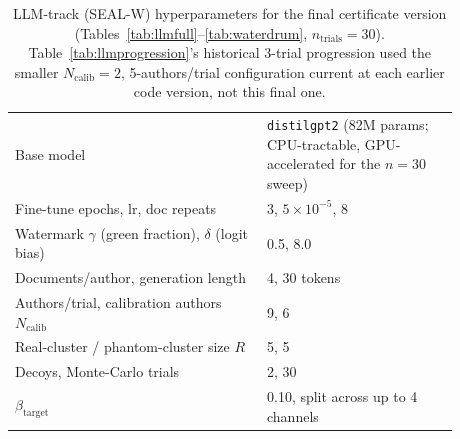 \documentclass[10pt,journal,compsoc]{IEEEtran}
\begin{document}
\begin{table}[t]
\centering
\footnotesize
\caption{LLM-track (SEAL-W) hyperparameters for the final certificate version (Tables~\ref{tab:llmfull}--\ref{tab:waterdrum}, $n_{\text{trials}}{=}30$). Table~\ref{tab:llmprogression}'s historical 3-trial progression used the smaller $N_{\text{calib}}{=}2$, 5-authors/trial configuration current at each earlier code version, not this final one.}
\label{tab:hyperparams-llm}
\begin{tabular}{@{}p{0.5\linewidth}p{0.38\linewidth}@{}}
\toprule
Base model & \texttt{distilgpt2} (82M params; CPU-tractable, GPU-accelerated for the $n{=}30$ sweep) \\
Fine-tune epochs, lr, doc repeats & 3, $5{\times}10^{-5}$, 8 \\
Watermark $\gamma$ (green fraction), $\delta$ (logit bias) & 0.5, 8.0 \\
Documents/author, generation length & 4, 30 tokens \\
Authors/trial, calibration authors $N_{\text{calib}}$ & 9, 6 \\
Real-cluster / phantom-cluster size $R$ & 5, 5 \\
Decoys, Monte-Carlo trials & 2, 30 \\
$\beta_{\text{target}}$ & 0.10, split across up to 4 channels \\
\bottomrule
\end{tabular}
\end{table}
\end{document}
